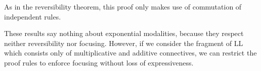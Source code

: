 As in the reversibility theorem, this proof only makes use of
commutation of independent rules.

These results say nothing about exponential modalities, because they
respect neither reversibility nor focusing. However, if we consider
the fragment of LL which consists only of multiplicative and additive
connectives, we can restrict the proof rules to enforce focusing
without loss of expressiveness.


